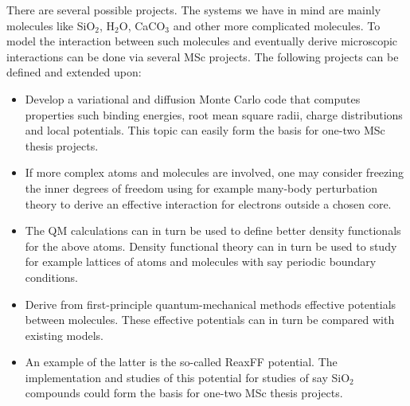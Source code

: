 \documentclass[10pt]{article}
\begin{document}
There are several possible projects. The systems we have in mind are mainly molecules like SiO$_2$, H$_2$O, CaCO$_3$ and other more complicated molecules. To model the interaction between such molecules and eventually derive microscopic interactions can be done via several MSc projects. The following projects can be defined and extended upon:
\begin{itemize}
\item Develop a variational and diffusion Monte Carlo code that computes properties such binding energies, root mean square radii, charge
distributions and local potentials.  This topic can easily form the basis for one-two MSc thesis projects.
\item If more complex atoms and molecules are involved, one may consider freezing the inner degrees of freedom using for example
many-body perturbation theory to derive an effective interaction for electrons outside a chosen core. 
\item The QM calculations can in turn be used to define better density functionals for the above atoms. Density functional theory can in turn
be used to study for example lattices of atoms and molecules with say periodic boundary conditions.
\item Derive from first-principle quantum-mechanical methods effective potentials between molecules. These effective potentials
can in turn be compared with existing models.
\item An example of the latter is the so-called  ReaxFF potential. The implementation and studies of this potential for 
studies of say  SiO$_2$ compounds
could form the basis  for one-two MSc thesis projects. 
\end{itemize}
\end{document}
